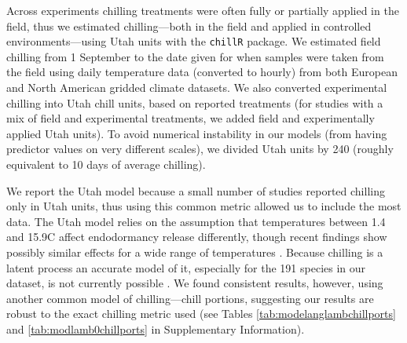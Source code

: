 \documentclass[11pt]{article}
\begin{document}
Across experiments chilling treatments were often fully or partially applied in the field, thus we estimated chilling---both in the field and applied in controlled environments---using Utah units with the \verb|chillR| package. We estimated field chilling from 1 September to the date given for when samples were taken from the field using daily temperature data (converted to hourly) from both European \citep[E-OBS, version 16, calculating the average of minimum and maximum daily temps,][]{cornes2018} and North American \citep[v3,][]{princetonclimate} gridded climate datasets. We also converted experimental chilling into Utah chill units, based on reported treatments (for studies with a mix of field and experimental treatments, we added field and experimentally applied Utah units). To avoid numerical instability in our models (from having predictor values on very different scales), we divided Utah units by 240 (roughly equivalent to 10 days of average chilling). 


We report the Utah model because a small number of studies reported chilling only in Utah units, thus using this common metric allowed us to include the most data. The Utah model relies on the assumption that temperatures between 1.4 and 15.9\degree C affect endodormancy release differently, though recent findings show possibly similar effects for a wide range of temperatures \citep[-2 to 10\degree C, see][]{baum2021}. Because chilling is a latent process an accurate model of it, especially for the 191 species in our dataset, is not currently possible \citep{ettinger2020}. We found consistent results, however, using another common model of chilling---chill portions, suggesting our results are robust to the exact chilling metric used (see Tables \ref{tab:modelanglambchillports} and \ref{tab:modlamb0chillports} in Supplementary Information).  
\end{document}
